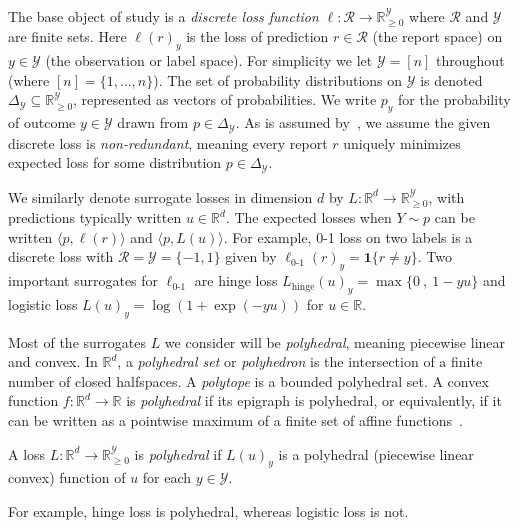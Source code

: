 \documentclass[anon]{colt2020} %
\newcommand{\reals}{\mathbb{R}}
\newcommand{\nonnegreals}{\reals_{\geq 0}}%
\newcommand{\simplex}{\Delta_\Y}
\newcommand{\R}{\mathcal{R}}
\newcommand{\Y}{\mathcal{Y}}
\newcommand{\hinge}{L_{\mathrm{hinge}}}
\newcommand{\ellzo}{\ell_{\text{0-1}}}
\newcommand{\inprod}[2]{\langle #1, #2 \rangle}%
\newcommand{\Ind}[1]{\mathbf{1}\{#1\}}
\begin{document}

The base object of study is a \emph{discrete loss function} $\ell: \R \to \nonnegreals^{\Y}$ where $\R$ and $\Y$ are finite sets.
Here $\ell(r)_y$ is the loss of prediction $r \in \R$ (the report space) on $y \in \Y$ (the observation or label space).
For simplicity we let $\Y = [n]$ throughout (where $[n] = \{1,\ldots,n\}$).
The set of probability distributions on $\Y$ is denoted $\simplex\subseteq\nonnegreals^{\Y}$, represented as vectors of probabilities.
We write $p_y$ for the probability of outcome $y \in \Y$ drawn from $p \in \simplex$.
As is assumed by~\cite{finocchiaro2019embedding}, we assume the given discrete loss is \emph{non-redundant}, meaning every report $r$ uniquely minimizes expected loss for some distribution $p\in\simplex$.

We similarly denote surrogate losses in dimension $d$ by $L:\reals^d\to\nonnegreals^{\Y}$, with predictions typically written $u\in\reals^d$.
The expected losses when $Y \sim p$ can be written $\inprod{p}{\ell(r)}$ and $\inprod{p}{L(u)}$.
For example, 0-1 loss on two labels is a discrete loss with $\R = \Y = \{-1,1\}$
given by $\ellzo(r)_y = \Ind{r \neq y}$.
Two important surrogates for $\ellzo$ are hinge loss $\hinge(u)_y = \max\{ 0 ~,~ 1-yu \}$ and logistic loss $L(u)_y = \log(1+\exp(-yu))$ for $u\in\reals$.

Most of the surrogates $L$ we consider will be \emph{polyhedral}, meaning piecewise linear and convex.
In $\reals^d$, a \emph{polyhedral set} or \emph{polyhedron} is the intersection of a finite number of closed halfspaces.
A \emph{polytope} is a bounded polyhedral set.
A convex function $f:\reals^d\to\reals$ is \emph{polyhedral} if its epigraph is polyhedral, or equivalently, if it can be written as a pointwise maximum of a finite set of affine functions~\citep{rockafellar1997convex}.
%
\begin{definition}
	A loss $L: \reals^d \to \nonnegreals^{\Y}$ is \emph{polyhedral} if $L(u)_y$ is a polyhedral (piecewise linear convex) function of $u$ for each $y\in\Y$.
\end{definition}
%
For example, hinge loss is polyhedral, whereas logistic loss is not.
\end{document}
